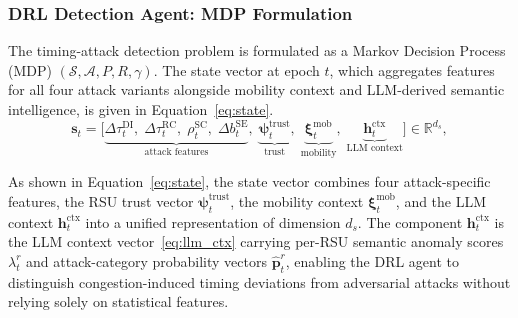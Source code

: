 \subsubsection{DRL Detection Agent: MDP Formulation}
\label{sec:drl}

The timing-attack detection problem is formulated as a Markov
Decision Process (MDP) $(\mathcal{S},\mathcal{A},P,R,\gamma)$.
The state vector at epoch $t$, which aggregates features for
all four attack variants alongside mobility context and
LLM-derived semantic intelligence, is given in
Equation~\eqref{eq:state}.
\begin{equation}
\mathbf{s}_t = \bigl[
  \underbrace{\Delta\tau_t^{\mathrm{DI}},\;
  \Delta\tau_t^{\mathrm{RC}},\;
  \rho_t^{\mathrm{SC}},\;
  \Delta b_t^{\mathrm{SE}}}_{\text{attack features}},\;
  \underbrace{\boldsymbol{\psi}_t^{\mathrm{trust}}}_{\text{trust}},\;
  \underbrace{\boldsymbol{\xi}_t^{\mathrm{mob}}}_{\text{mobility}},\;
  \underbrace{\mathbf{h}_t^{\mathrm{ctx}}}_{\text{LLM context}}
\bigr] \in \mathbb{R}^{d_s},
\label{eq:state}
\end{equation}

As shown in Equation~\eqref{eq:state}, the state vector
combines four attack-specific features, the RSU trust vector
$\boldsymbol{\psi}_t^{\mathrm{trust}}$, the mobility context
$\boldsymbol{\xi}_t^{\mathrm{mob}}$, and the LLM context
$\mathbf{h}_t^{\mathrm{ctx}}$ into a unified representation
of dimension $d_s$. The component $\mathbf{h}_t^{\mathrm{ctx}}$
is the LLM context vector~\eqref{eq:llm_ctx} carrying per-RSU
semantic anomaly scores $\lambda_t^r$ and attack-category
probability vectors $\hat{\mathbf{p}}_t^r$, enabling the DRL
agent to distinguish congestion-induced timing deviations from
adversarial attacks without relying solely on statistical
features.

